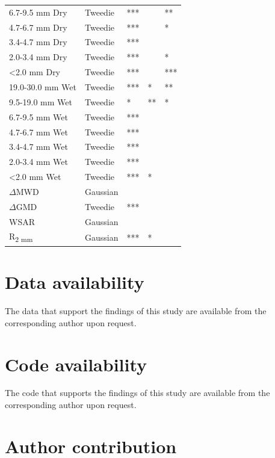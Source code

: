 \begin{table}[htbp]
\begin{tabular}{@{}lllll@{}}
6.7-9.5 mm Dry	& Tweedie	& ***	& 	& ** \\
4.7-6.7 mm Dry	& Tweedie	& ***	& 	& * \\
3.4-4.7 mm Dry	& Tweedie	& ***	& 	&  \\
2.0-3.4 mm Dry	& Tweedie	& ***	& 	& * \\
\textless2.0 mm Dry	& Tweedie	& ***	& 	& *** \\ %
19.0-30.0 mm Wet	& Tweedie	& ***	& *	& ** \\
9.5-19.0 mm Wet	& Tweedie	& *	& **	& * \\
6.7-9.5 mm Wet	& Tweedie	& ***	& 	&  \\
4.7-6.7 mm Wet	& Tweedie	& ***	& 	&  \\
3.4-4.7 mm Wet	& Tweedie	& ***	& 	&  \\
2.0-3.4 mm Wet	& Tweedie	& ***	& 	&  \\
\textless2.0 mm Wet	& Tweedie	& ***	& *	&  \\ %
$\Delta$MWD	& Gaussian	& 	& 	&  \\ %
$\Delta$GMD	& Tweedie	& ***	& 	&  \\ %
WSAR	& Gaussian	& 	& 	&  \\
R\textsubscript{2 mm}	& Gaussian	& ***	& *	&  \\ %
\bottomrule
\end{tabular}
\end{table}

\FloatBarrier

\section*{Data availability}

The data that support the findings of this study are available from the corresponding author upon request.

\section*{Code availability}

The code that supports the findings of this study are available from the corresponding author upon request.

\section*{Author contribution}

